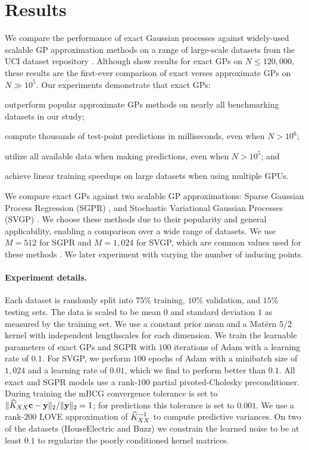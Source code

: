 \section{Results}
\label{sec:largeexact_results}

We compare the performance of exact Gaussian processes against widely-used scalable GP approximation methods on a range of large-scale datasets from the UCI dataset repository \cite{asuncion2007uci}.
Although \citet{nguyen2019exact} show results for exact GPs on $N \leq 120,\!000$, these results are the first-ever comparison of exact verses approximate GPs on $N\gg 10^5$.
Our experiments demonstrate that exact GPs:
\begin{enumerate*}
  \item outperform popular approximate GPs methods on nearly all benchmarking datasets in our study;
  \item compute thousands of test-point predictions in milliseconds, even when $N > 10^6$;
  \item utilize all available data when making predictions, even when $N > 10^5$; and
  \item achieve linear training speedups on large datasets when using multiple GPUs.
\end{enumerate*}

We compare exact GPs against two scalable GP approximations: Sparse Gaussian Process Regression (SGPR) \cite{titsias2009variational}, and Stochastic Variational Gaussian Processes (SVGP) \cite{hensman2013gaussian}.
We choose these methods due to their popularity and general applicability, enabling a comparison over a wide range of datasets.
We use $M = 512$ for SGPR and $M = 1,\!024$ for SVGP, which are common values used for these methods \cite{matthews2017gpflow}.
We later experiment with varying the number of inducing points.

\paragraph{Experiment details.}
Each dataset is randomly split into $75\%$ training, $10\%$ validation, and $15\%$ testing sets.
The data is scaled to be mean $0$ and standard deviation $1$ as measured by the training set.
We use a constant prior mean and a Mat\'ern 5/2 kernel with independent lengthscales for each dimension.
We train the learnable parameters of exact GPs and SGPR with $100$ iterations of Adam with a learning rate of $0.1$.
For SVGP, we perform $100$ epochs of Adam with a minibatch size of $1,\!024$ and a learning rate of $0.01$, which we find to perform better than $0.1$.
All exact and SGPR models use a rank-$100$ partial pivoted-Cholesky preconditioner.
During training the mBCG convergence tolerance is set to  $\Vert \widehat{K}_{XX} \mathbf{c} - \mathbf{y} \Vert_2 / \Vert \mathbf{y} \Vert_2 = 1$; for predictions this tolerance is set to $0.001$.
We use a rank-$200$ LOVE approximation of $\widehat{K}_{XX}^{-1}$ to compute predictive variances.
On two of the datasets (HouseElectric and Buzz) we constrain the learned noise to be at least $0.1$ to regularize the poorly conditioned kernel matrices.

